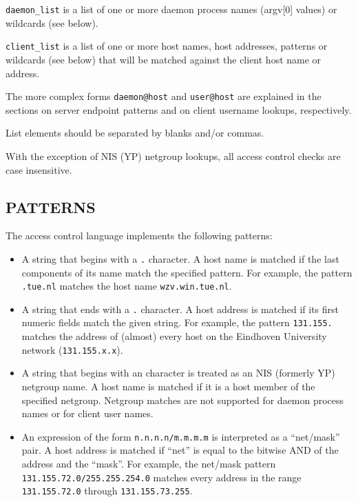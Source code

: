 \documentclass[11pt,twoside,onecolumn]{book}
\begin{document}
{\tt daemon\_list} is a list of one or more daemon process names
(argv[0] values) or wildcards (see below).  

{\tt client\_list} is a list
of one or more host names, host addresses, patterns or wildcards (see
below) that will be matched against the client host name or address.

The more complex forms {\tt daemon@host} and {\tt user@host} are
explained in the sections on server endpoint patterns and on client
username lookups, respectively.

List elements should be separated by blanks and/or commas.  

With the exception of NIS (YP) netgroup lookups, all access control
checks are case insensitive.

\subsection*{PATTERNS}

The access control language implements the following patterns:

\begin{itemize}

\item A string that begins with a {\tt .} character. A host name is matched if
the last components of its name match the specified pattern.  For
example, the pattern {\tt .tue.nl} matches the host name
{\tt wzv.win.tue.nl}.

\item A string that ends with a {\tt .} character. A host address is matched if
its first numeric fields match the given string.  For example, the
pattern {\tt 131.155.} matches the address of (almost) every host on the
Eindhoven University network ({\tt 131.155.x.x}).

\item A string that begins with an {\tt \@} character is treated as an NIS
(formerly YP) netgroup name. A host name is matched if it is a host
member of the specified netgroup. Netgroup matches are not supported
for daemon process names or for client user names.

\item An expression of the form {\tt n.n.n.n/m.m.m.m} is interpreted as a
``net/mask'' pair. A host address is matched if ``net'' is equal to the
bitwise AND of the address and the ``mask''. For example, the net/mask
pattern {\tt 131.155.72.0/255.255.254.0} matches every address in the
range {\tt 131.155.72.0} through {\tt 131.155.73.255}.

\end{itemize}
\end{document}
